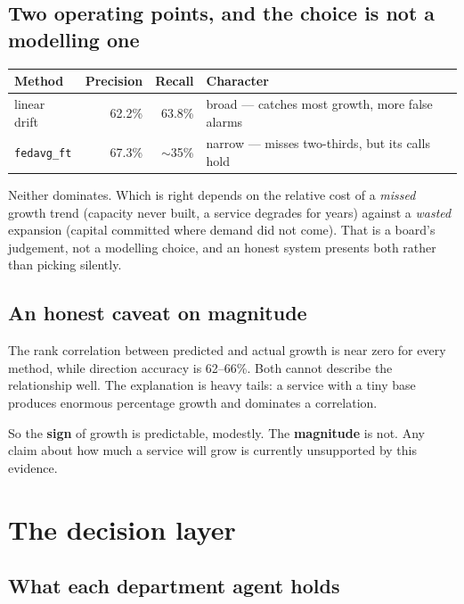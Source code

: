 \documentclass[11pt,a4paper]{article}
\newcommand{\keypoint}[1]{%
  \par\vspace{0.4em}%
  \noindent\colorbox{fed!8}{\parbox{0.98\textwidth}{\vspace{0.2em}#1\vspace{0.2em}}}%
  \par\vspace{0.4em}}
\begin{document}
\subsection{Two operating points, and the choice is not a modelling one}

\begin{center}
\begin{tabular}{@{}lrrp{6.2cm}@{}}
\toprule
\textbf{Method} & \textbf{Precision} & \textbf{Recall} & \textbf{Character} \\
\midrule
linear drift & 62.2\% & 63.8\% & broad --- catches most growth, more false alarms \\
\texttt{fedavg\_ft} & 67.3\% & $\sim$35\% & narrow --- misses two-thirds, but its calls hold \\
\bottomrule
\end{tabular}
\end{center}

Neither dominates. Which is right depends on the relative cost of a \emph{missed} growth trend
(capacity never built, a service degrades for years) against a \emph{wasted} expansion (capital
committed where demand did not come). That is a board's judgement, not a modelling choice, and an
honest system presents both rather than picking silently.

\subsection{An honest caveat on magnitude}

The rank correlation between predicted and actual growth is near zero for every method, while direction
accuracy is 62--66\%. Both cannot describe the relationship well. The explanation is heavy tails: a
service with a tiny base produces enormous percentage growth and dominates a correlation.

\keypoint{So the \textbf{sign} of growth is predictable, modestly. The \textbf{magnitude} is not. Any
claim about how much a service will grow is currently unsupported by this evidence.}

\section{The decision layer}
\label{sec:decision}

\subsection{What each department agent holds}
\end{document}
